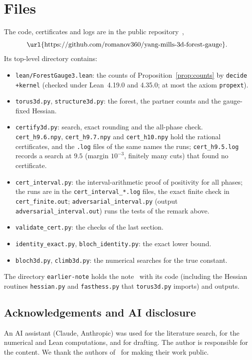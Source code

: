 \documentclass[11pt]{amsart}
\theoremstyle{definition}
\theoremstyle{remark}
\begin{document}
\section{Files}\label{app:files}
The code, certificates and logs are in the public repository~\cite{code},
\[\text{\url{https://github.com/romanov360/yang-mills-3d-forest-gauge}}.\]
Its top-level directory contains:
{\sloppy
\begin{itemize}
\item \texttt{lean/ForestGauge3.lean}: the counts of Proposition~\ref{prop:counts} by \texttt{decide +kernel}
(checked under Lean~4.19.0 and 4.35.0; at most the axiom \texttt{propext}).
\item \texttt{torus3d.py}, \texttt{structure3d.py}: the forest, the partner counts and the gauge-fixed Hessian.
\item \texttt{certify3d.py}: search, exact rounding and the all-phase check. \texttt{cert\_h9.6.npy}, \texttt{cert\_h9.7.npy} and
\texttt{cert\_h10.npy} hold the rational certificates, and the \texttt{.log} files of the same names the runs; \texttt{cert\_h9.5.log} records a search at $9.5$ (margin $10^{-3}$, finitely many cuts) that found no certificate.
\item \texttt{cert\_interval.py}: the interval-arithmetic proof of positivity for all phases; the runs are in the
\texttt{cert\_interval\_*.log} files, the exact finite check in \texttt{cert\_finite.out}; \texttt{adversarial\_interval.py} (output \texttt{adversarial\_interval.out}) runs the tests of the remark above.
\item \texttt{validate\_cert.py}: the checks of the last section.
\item \texttt{identity\_exact.py}, \texttt{bloch\_identity.py}: the exact lower bound.
\item \texttt{bloch3d.py}, \texttt{climb3d.py}: the numerical searches for the true constant.
\end{itemize}
\par}
The directory \texttt{earlier-note} holds the note~\cite{R} with its code (including the Hessian routines
\texttt{hessian.py} and \texttt{fasthess.py} that \texttt{torus3d.py} imports) and outputs.

\subsection*{Acknowledgements and AI disclosure}
An AI assistant (Claude, Anthropic) was used for the literature search, for the numerical and Lean computations, and
for drafting. The author is responsible for the content. We thank the authors of~\cite{BB-zen,BBL} for
making their work public.
\end{document}
